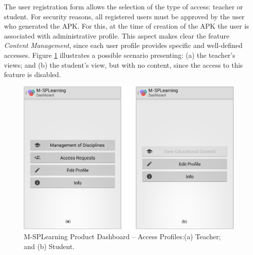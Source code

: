 The user registration form allows the selection of the type of access: teacher or student. For security reasons, all registered users must be approved by the user who generated the APK. For this, at the time of creation of the APK the user is associated with administrative profile. This aspect makes clear the feature \textit{Content Management}, since each user profile provides specific and well-defined accesses. Figure \ref{figureMSPLDashboardApp} illustrates a possible scenario presenting: (a) the teacher's views; and (b) the student's view, but with no content, since the access to this feature is disabled.

\begin{figure}[!ht]
\centering
\includegraphics[scale=0.325]{figures/section3/MSPLDashboardApp}
\caption{M-SPLearning Product Dashboard -- Access Profiles:\newline(a) Teacher; and (b) Student.}
\label{figureMSPLDashboardApp}
\end{figure}


